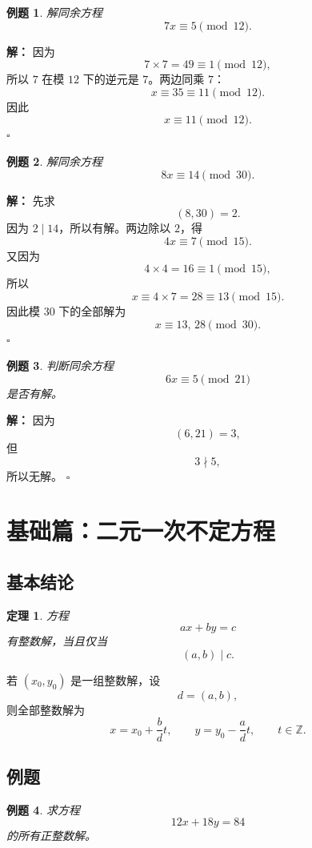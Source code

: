 \documentclass[11pt,a4paper,fontset=fandol]{ctexart}
\theoremstyle{formaltheorem}
\newtheorem{theorem}{定理}[section]
\theoremstyle{formalexample}
\newtheorem{example}{例题}[section]
\newenvironment{solution}{\par\noindent\textbf{解：}}{\hfill$\square$\par}
\begin{document}
\begin{example}
解同余方程
\[
7x\equiv 5\pmod{12}.
\]
\end{example}

\begin{solution}
因为
\[
7\times 7=49\equiv 1\pmod{12},
\]
所以 $7$ 在模 $12$ 下的逆元是 $7$。两边同乘 $7$：
\[
x\equiv 35\equiv 11\pmod{12}.
\]
因此
\[
\boxed{x\equiv 11\pmod{12}}.
\]
\end{solution}

\begin{example}
解同余方程
\[
8x\equiv 14\pmod{30}.
\]
\end{example}

\begin{solution}
先求
\[
(8,30)=2.
\]
因为 $2\mid 14$，所以有解。两边除以 $2$，得
\[
4x\equiv 7\pmod{15}.
\]
又因为
\[
4\times 4=16\equiv 1\pmod{15},
\]
所以
\[
x\equiv 4\times 7=28\equiv 13\pmod{15}.
\]
因此模 $30$ 下的全部解为
\[
\boxed{x\equiv 13,\,28\pmod{30}}.
\]
\end{solution}

\begin{example}
判断同余方程
\[
6x\equiv 5\pmod{21}
\]
是否有解。
\end{example}

\begin{solution}
因为
\[
(6,21)=3,
\]
但
\[
3\nmid 5,
\]
所以无解。
\end{solution}

\section{基础篇：二元一次不定方程}

\subsection{基本结论}

\begin{theorem}
方程
\[
ax+by=c
\]
有整数解，当且仅当
\[
(a,b)\mid c.
\]
\end{theorem}

若 $(x_0,y_0)$ 是一组整数解，设
\[
d=(a,b),
\]
则全部整数解为
\[
x=x_0+\frac{b}{d}t,\qquad y=y_0-\frac{a}{d}t,\qquad t\in \mathbb{Z}.
\]

\subsection{例题}

\begin{example}
求方程
\[
12x+18y=84
\]
的所有正整数解。
\end{example}
\end{document}
